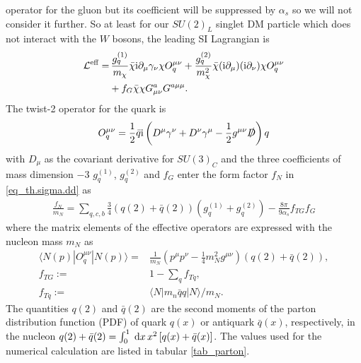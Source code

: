 operator for the gluon but its coefficient will be suppressed by $\alpha_s$ so we will not consider it further. So at least for our $SU(2)_L$ singlet
DM particle which does not interact with the $W$ bosons, the leading SI Lagrangian is
\begin{align}
 \mathcal{L}^\text{eff} =&\, \frac{g_q^{(1)}}{m_\chi} \bar \chi\text{i} \partial_\mu \gamma_\nu\chi O_q^{\mu\nu} + \frac{g_q^{(2)}}{m^2_\chi} \bar \chi(\text{i} \partial_\mu) (\text{i}\partial_\nu)\chi O_q^{\mu\nu} \\
 \nonumber
 &+ f_G \bar \chi \chi G^a_{\mu\nu} G^{a\mu\mu}.
\end{align}
The twist-2 operator for the quark is
\begin{align}
 O_q^{\mu\nu} = \frac12 \bar q \text{i} \left(D^\mu \gamma^\nu + D^\nu \gamma^\mu - \frac12 g^{\mu\nu} \slashed{D}\right) q
\end{align}
with $D_\mu$ as the covariant derivative for $SU(3)_C$ and the three coefficients of mass dimension $-3$ $g_q^{(1)}$, $g_q^{(2)}$ and $f_G$ enter 
the form factor $f_N$ in \eqref{eq_th.sigma.dd} as
\begin{align}
 \frac{f_N}{m_N} = \sum\limits_{q,c,b} \frac34 \left(q(2)+\bar q(2)\right) \left(g_q^{(1)} + g_q^{(2)}\right) - \frac{8\pi}{9\alpha_s}f_{TG}f_G
 \label{eq_ddformfactorA}
\end{align}
where the matrix elements of the effective operators are expressed with the nucleon mass $m_N$ as \cite{1007.2601}
\begin{subequations}
\begin{align}
 \langle N(p)| O_q^{\mu\nu} | N(p)\rangle =& \frac{1}{m_N}\left(p^\mu p^\nu - \frac14 m_N^2 g^{\mu\nu}\right) \left(q(2) + \bar q(2)\right),\\
 f_{TG} :=& 1- \sum\limits_q f_{Tq},\\
 f_{Tq} :=& \langle N|m_n \bar qq |N\rangle /m_N.
\end{align}
\end{subequations}
The quantities $q(2)$ and $\bar q(2)$ are the second moments \cite{0811.1779} of the parton distribution function (PDF) of quark $q(x)$ or antiquark 
$\bar q(x)$, respectively, in the nucleon $q(2)+\bar q(2) = \int_0^1 \; \mathrm{d} x\, x^2 \left[q(x) + \bar q(x)\right]$. The values used for the numerical
calculation are listed in tabular \ref{tab_parton}.
